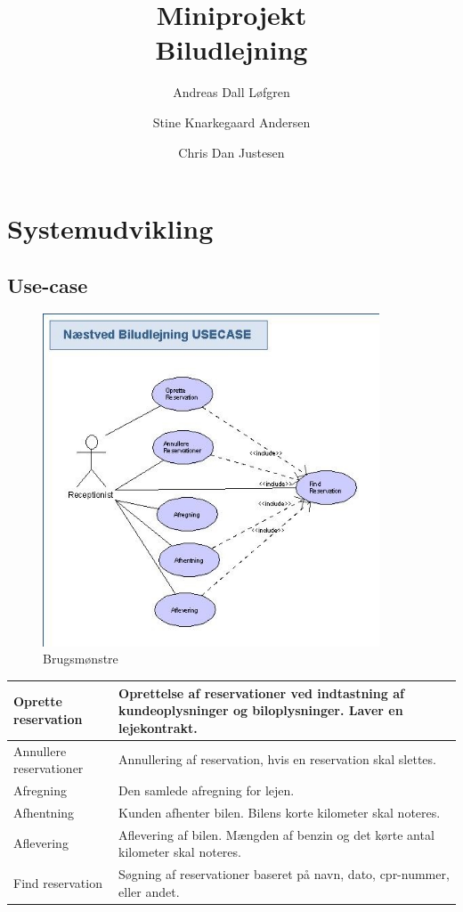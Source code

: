 \documentclass[11pt]{article}
\title%
{%
	{\large Miniprojekt}\\
	Biludlejning
}
\author%
{%
	Andreas Dall Løfgren\\
	\and
	Stine Knarkegaard Andersen\\
	\and
	Chris Dan Justesen\\
}
\begin{document}
\maketitle
\pagebreak
\tableofcontents

\section*{Systemudvikling}
\subsection*{Use-case}
\begin{figure}
  \centering
  \includegraphics[width=10cm]{Naestved_Biludlejning_USECASE.jpeg}
  \caption{Brugsmønstre}
  \label{fig:Use-case diagram}
\end{figure}

\begin{tabular}{ l | p{10cm} }
Oprette reservation & Oprettelse af reservationer ved indtastning af kundeoplysninger og biloplysninger. Laver en lejekontrakt. \\ \hline
Annullere reservationer & Annullering af reservation, hvis en reservation skal slettes. \\ \hline
Afregning & Den samlede afregning for lejen. \\ \hline
Afhentning & Kunden afhenter bilen. Bilens korte kilometer skal noteres.\\ \hline
Aflevering & Aflevering af bilen. Mængden af benzin og det kørte antal kilometer skal noteres. \\ \hline
Find reservation & Søgning af reservationer baseret på navn, dato, cpr-nummer, eller andet.
\end{tabular}\\
\end{document}
